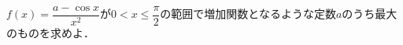 \documentclass[../../main.tex]{subfiles}
\begin{document}
$f(x)=\dfrac{a-\cos x}{x^2}$が$0 < x \le \dfrac{\pi}{2}$の範囲で増加関数となるような定数$a$のうち最大のものを求めよ．
\end{document}
